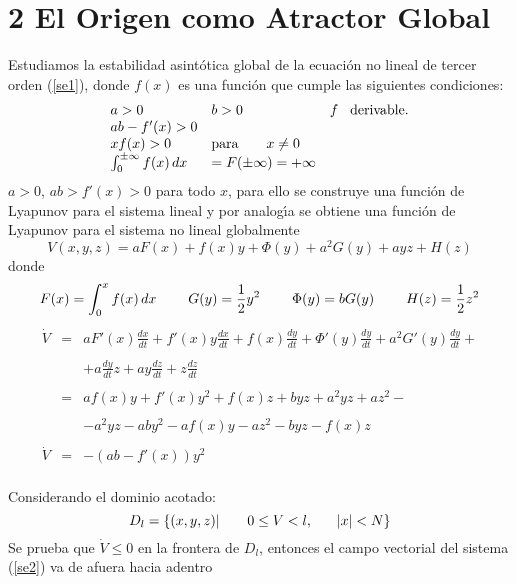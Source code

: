 \documentclass[letter]{article}
\newtheorem{theo}{Teorema}
\begin{document}
\section{2 El Origen como Atractor Global}
 \color{black}  Estudiamos  la estabilidad  asint{\'o}tica global de la
ecuaci{\'o}n no lineal de tercer orden (\ref{se1}), donde $f(x)$ es
una funci{\'o}n que cumple las siguientes condiciones:
\\
\begin{equation}\label{Condf1}
\begin{array}{lll}
a>0& b>0& f\hspace{0.3 cm}\textrm{derivable.}\\
ab-f'(x)>0&&\\
xf(x)>0& \textrm{para}\quad\quad x\neq0&\\
\int_0^{\pm \infty}f(x)\, dx&=F(\pm\infty)=+\infty
\end{array}
\end{equation}  $a>0$, $ab>f'(x)>0$ para todo $x$, para ello se
construye una funci{\'o}n de Lyapunov para el sistema lineal y por
analog{\'\i}a se obtiene una funci{\'o}n de Lyapunov para el sistema no
lineal
globalmente
\begin{equation}\label{SAe11}
V(x,y,z)=a F(x)+f(x)y+\Phi(y)+a^2G(y)+ayz+H(z)
\end{equation}
donde
$$F(x)=\int_0^xf(x)\,
dx\hspace{0.8cm}G(y)=\displaystyle{\frac{1}{2}}y^2\hspace{0.8cm}
\Phi(y)=bG(y)\hspace{0.8cm}H(z)=\displaystyle{\frac{1}{2}}z^2$$
\begin{displaymath}
\begin{array}{lcl}
\dot{V}&=&a
F'(x)\displaystyle{\frac{dx}{dt}}+f'(x)y\displaystyle{\frac{dx}{dt}}+f(x)
\displaystyle{\frac{dy}{dt}}+\Phi'(y)\displaystyle{\frac{dy}{dt}}+
a^2G'(y)\displaystyle{\frac{dy}{dt}}+\\&&\\
&&+a\displaystyle{\frac{dy}{dt}}z+ay\displaystyle{\frac{dz}{dt}}+
z\displaystyle{\frac{dz}{dt}}\\&&\\
&=&af(x)y+f'(x)y^2+f(x)z+byz+a^2yz+az^2-\\&&\\
&&-a^2yz-aby^2-af(x)y-az^2-byz-f(x)z\\&&\\
\dot{V}&=&-(ab-f'(x))y^2
\end{array}
\end{displaymath}
\\
Considerando el dominio acotado:\\
$$D_l=\{(x,y,z)|\hspace{0.7cm}0\leq V<l,\hspace{0.6cm}|x|<N\}$$
Se prueba que $\dot{V}\leq 0$ en la frontera de $D_l$, entonces el
campo vectorial del sistema (\ref{se2}) va de afuera hacia adentro
\headskip=20pt
\end{document}
